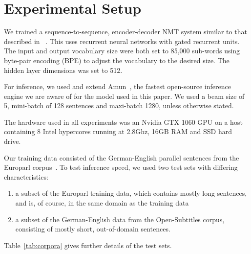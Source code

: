 \documentclass[11pt,a4paper]{article}
\begin{document}


\section{Experimental Setup}
\label{sec:Experimental Setup}

We trained a sequence-to-sequence, encoder-decoder NMT system similar to that described in ~\cite{sennrich-haddow-birch:2016:P16-12}. This uses recurrent neural networks with gated recurrent units. The input and output vocabulary size were both set to 85,000 sub-words using byte-pair encoding (BPE) to adjust the vocabulary to the desired size. The hidden layer dimensions was set to 512. %

For inference, we used and extend Amun~\citep{junczys2016neural}, the fastest open-source inference engine we are aware of for the model used in this paper. We used a beam size of 5, mini-batch of 128 sentences and maxi-batch 1280, unless otherwise stated.

The hardware used in all experiments was an Nvidia GTX 1060 GPU on a host containing 8 Intel hypercores running at 2.8Ghz, 16GB RAM and SSD hard drive.

Our training data consisted of the German-English parallel sentences from the Europarl corpus~\citep{Koehn:2005:MTS}. To test inference speed, we used two test sets with differing characteristics:
\begin{enumerate}
   \item \vspace{-2 mm} a subset of the Europarl training data, which contains mostly long sentences, and is, of course, in the same domain as the training data
   \item \vspace{-2 mm} a subset of the German-English data from the Open-Subtitles corpus, consisting of mostly short, out-of-domain sentences.
\end{enumerate}
Table~\ref{tab:corpora} gives further details of the test sets.
\end{document}
